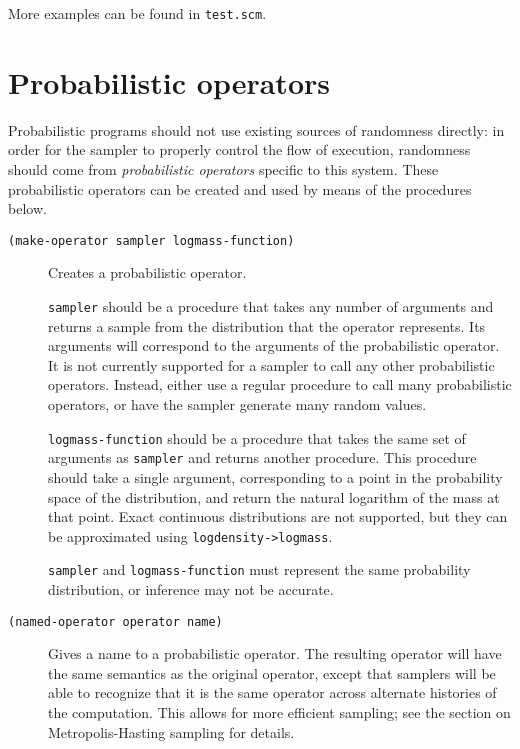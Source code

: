 \documentclass{article}
\begin{document}
More examples can be found in \texttt{test.scm}.

\section{Probabilistic operators}

Probabilistic programs should not use existing sources of randomness
directly: in order for the sampler to properly control the flow of
execution, randomness should come from \textit{probabilistic
  operators} specific to this system. These probabilistic operators
can be created and used by means of the procedures below.

\begin{description}
  \item[\texttt{(make-operator sampler logmass-function)}] \hfill

    Creates a probabilistic operator.

    \texttt{sampler} should be a procedure that takes any number of
    arguments and returns a sample from the distribution that the
    operator represents. Its arguments will correspond to the
    arguments of the probabilistic operator. It is not currently
    supported for a sampler to call any other probabilistic
    operators. Instead, either use a regular procedure to call many
    probabilistic operators, or have the sampler generate many random
    values.

    \texttt{logmass-function} should be a procedure that takes the
    same set of arguments as \texttt{sampler} and returns another
    procedure. This procedure should take a single argument,
    corresponding to a point in the probability space of the
    distribution, and return the natural logarithm of the mass at that
    point. Exact continuous distributions are not supported, but they
    can be approximated using \texttt{logdensity->logmass}.

    \texttt{sampler} and \texttt{logmass-function} must represent the
    same probability distribution, or inference may not be accurate.

  \item[\texttt{(named-operator operator name)}] \hfill

    Gives a name to a probabilistic operator. The resulting operator
    will have the same semantics as the original operator, except that
    samplers will be able to recognize that it is the same operator
    across alternate histories of the computation. This allows for
    more efficient sampling; see the section on Metropolis-Hasting
    sampling for details.


\end{description}
\end{document}
